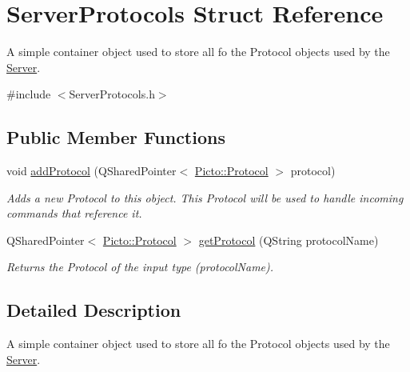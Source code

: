 \hypertarget{struct_server_protocols}{\section{Server\-Protocols Struct Reference}
\label{struct_server_protocols}
}


A simple container object used to store all fo the Protocol objects used by the \hyperlink{class_server}{Server}.  




{\ttfamily \#include $<$Server\-Protocols.\-h$>$}

\subsection*{Public Member Functions}
\begin{DoxyCompactItemize}
\item 
\hypertarget{struct_server_protocols_a5110d75c391df5bfc8be79b9f968dc89}{void \hyperlink{struct_server_protocols_a5110d75c391df5bfc8be79b9f968dc89}{add\-Protocol} (Q\-Shared\-Pointer$<$ \hyperlink{struct_picto_1_1_protocol}{Picto\-::\-Protocol} $>$ protocol)}\label{struct_server_protocols_a5110d75c391df5bfc8be79b9f968dc89}

\begin{DoxyCompactList}\small\item\em Adds a new Protocol to this object. This Protocol will be used to handle incoming commands that reference it. \end{DoxyCompactList}\item 
\hypertarget{struct_server_protocols_a0c125b0927a253fdde9ac08d4074a20e}{Q\-Shared\-Pointer$<$ \hyperlink{struct_picto_1_1_protocol}{Picto\-::\-Protocol} $>$ \hyperlink{struct_server_protocols_a0c125b0927a253fdde9ac08d4074a20e}{get\-Protocol} (Q\-String protocol\-Name)}\label{struct_server_protocols_a0c125b0927a253fdde9ac08d4074a20e}

\begin{DoxyCompactList}\small\item\em Returns the Protocol of the input type (protocol\-Name). \end{DoxyCompactList}\end{DoxyCompactItemize}


\subsection{Detailed Description}
A simple container object used to store all fo the Protocol objects used by the \hyperlink{class_server}{Server}. 


